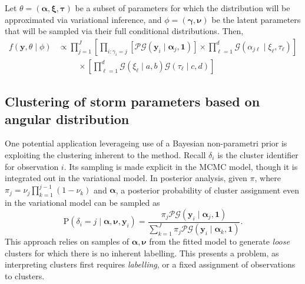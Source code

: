 Let $\theta = (\bm{\alpha},\bm{\xi},\bm{\tau})$ be a subset of parameters for which the distribution will be approximated via variational inference,
and $\phi = (\bm{\gamma},\bm{\nu})$ be the latent parameters that will be sampled via their full conditional distributions.  Then,
\begin{equation}
    \begin{aligned}
        f(\bm{y},\theta\mid\phi) &\propto \mathcal \prod_{j = 1}^J\left[\prod_{i:\gamma_i = j}\left[\mathcal{PG}(\bm{y}_i\mid\bm{\alpha}_j,\bm{1})\right]\times\prod_{\ell = 1}^d\mathcal{G}(\alpha_{j\ell}\mid\xi_{\ell},\tau_{\ell})\right] \\
        &\hspace{1cm}\times \left[\prod_{\ell = 1}^d\mathcal{G}(\xi_{\ell}\mid a, b)\mathcal{G}(\tau_{\ell}\mid c,d)\right]        
    \end{aligned}
\end{equation}

\cite{tran2021}

\subsection{Clustering of storm parameters based on angular distribution}

One potential application leverageing use of a Bayesian non-parametri prior is 
    exploiting the clustering inherent to the method. Recall $\delta_i$ is the 
    cluster identifier for observation $i$.  Its sampling is made explicit in
    the MCMC model, though it is integrated out in the variational model. In
    posterior analysis, given $\pi$, where $\pi_j = \nu_j\prod_{k = 1}^{j-1}(1 - \nu_k)$
    and $\bm{\alpha}$, a posterior probability of cluster assignment even
    in the variational model can be sampled as
    \begin{equation}
        \label{eqn:clusterprob}
        \text{P}\left(\delta_i = j\mid\bm{\alpha},\bm{\nu},\bm{y}_i\right) 
            = \frac{\pi_j\mathcal{PG}(\bm{y}_i\mid\bm{\alpha}_j,\bm{1})}{
            \sum_{k = 1}^J \pi_j\mathcal{PG}(\bm{y}_i\mid\bm{\alpha}_k,\bm{1})}.
    \end{equation}
    This approach relies on samples of $\bm{\alpha},\bm{\nu}$ from the fitted
    model to generate \emph{loose} clusters for which there is no inherent 
    labelling.  This presents a problem, as interpreting clusters first requires
    \emph{labelling}, or a fixed assignment of observations to clusters.

